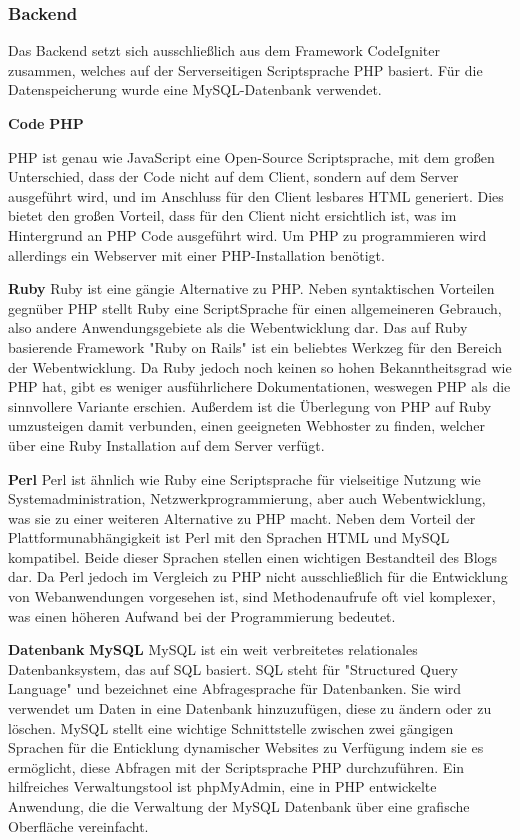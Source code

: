     \subsubsection{Backend}
    Das Backend setzt sich ausschließlich aus dem Framework CodeIgniter zusammen, welches auf der Serverseitigen Scriptsprache PHP basiert. Für die Datenspeicherung
    wurde eine MySQL-Datenbank verwendet.

    \textbf{Code}
    \textbf{PHP}
    {PHP\cite{php} ist genau wie JavaScript eine Open-Source Scriptsprache, mit dem großen Unterschied, dass der Code nicht auf dem Client, sondern auf dem Server ausgeführt wird,
    und im Anschluss für den Client lesbares HTML generiert. Dies bietet den großen Vorteil, dass für den Client nicht ersichtlich ist, was im Hintergrund an PHP Code ausgeführt
    wird. Um PHP zu programmieren wird allerdings ein Webserver mit einer PHP-Installation benötigt.

    \textbf{Ruby}
    {Ruby\cite{ruby}} ist eine gängie Alternative zu PHP. Neben syntaktischen Vorteilen gegnüber PHP stellt Ruby eine ScriptSprache für einen allgemeineren Gebrauch,
    also andere Anwendungsgebiete als die Webentwicklung dar. Das auf Ruby basierende Framework "Ruby on Rails" ist ein beliebtes Werkzeg für den Bereich der Webentwicklung.
    Da Ruby jedoch noch keinen so hohen Bekanntheitsgrad wie PHP hat, gibt es weniger ausführlichere Dokumentationen, weswegen PHP als die sinnvollere Variante erschien.
    Außerdem ist die Überlegung von PHP auf Ruby umzusteigen damit verbunden, einen geeigneten Webhoster zu finden, welcher über eine Ruby Installation auf dem Server verfügt.

    \textbf{Perl}
    {Perl\cite{perl}} ist ähnlich wie Ruby eine Scriptsprache für vielseitige Nutzung wie Systemadministration, Netzwerkprogrammierung, aber auch Webentwicklung, was sie
    zu einer weiteren Alternative zu PHP macht. Neben dem Vorteil der Plattformunabhängigkeit ist Perl mit den Sprachen HTML und MySQL kompatibel. Beide dieser Sprachen stellen
    einen wichtigen Bestandteil des Blogs dar. Da Perl jedoch im Vergleich zu PHP nicht ausschließlich für die Entwicklung von Webanwendungen vorgesehen ist, sind
    Methodenaufrufe oft viel komplexer, was einen höheren Aufwand bei der Programmierung bedeutet.

    \textbf{Datenbank}
    \textbf{MySQL}
    MySQL ist ein weit verbreitetes relationales Datenbanksystem, das auf SQL basiert. SQL steht für "Structured Query Language" und bezeichnet eine Abfragesprache für Datenbanken.
    Sie wird verwendet um Daten in eine Datenbank hinzuzufügen, diese zu ändern oder zu löschen. MySQL stellt eine wichtige Schnittstelle zwischen zwei gängigen Sprachen für
    die Enticklung dynamischer Websites zu Verfügung indem sie es ermöglicht, diese Abfragen mit der Scriptsprache PHP durchzuführen. Ein hilfreiches Verwaltungstool ist phpMyAdmin,
    eine in PHP entwickelte Anwendung, die die Verwaltung der MySQL Datenbank über eine grafische Oberfläche vereinfacht.

}
